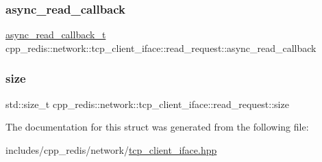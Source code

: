 \subsubsection{\texorpdfstring{async\+\_\+read\+\_\+callback}{async\_read\_callback}}
{\footnotesize\ttfamily \hyperlink{classcpp__redis_1_1network_1_1tcp__client__iface_ae8bf79e8e1f1d7e359ed1c7cdc4026fc}{async\+\_\+read\+\_\+callback\+\_\+t} cpp\+\_\+redis\+::network\+::tcp\+\_\+client\+\_\+iface\+::read\+\_\+request\+::async\+\_\+read\+\_\+callback}

\mbox{\label{structcpp__redis_1_1network_1_1tcp__client__iface_1_1read__request_a5ff8258391c9b3c8d2ce1a5c5a0304be}} 
\subsubsection{\texorpdfstring{size}{size}}
{\footnotesize\ttfamily std\+::size\+\_\+t cpp\+\_\+redis\+::network\+::tcp\+\_\+client\+\_\+iface\+::read\+\_\+request\+::size}



The documentation for this struct was generated from the following file\+:\begin{DoxyCompactItemize}
\item 
includes/cpp\+\_\+redis/network/\hyperlink{tcp__client__iface_8hpp}{tcp\+\_\+client\+\_\+iface.\+hpp}\end{DoxyCompactItemize}
